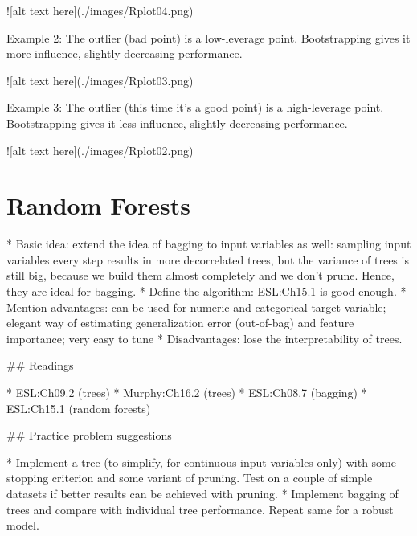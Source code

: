 ![alt text here](./images/Rplot04.png)

Example 2: The outlier (bad point) is a low-leverage point. Bootstrapping gives it more influence, slightly decreasing performance.


![alt text here](./images/Rplot03.png)

Example 3: The outlier (this time it's a good point) is a high-leverage point. Bootstrapping gives it less influence, slightly decreasing performance.

![alt text here](./images/Rplot02.png)


\section{Random Forests}

* Basic idea: extend the idea of bagging to input variables as well: sampling input variables every step results in more decorrelated trees, but the variance of trees is still big, because we build them almost completely and we don't prune. Hence, they are ideal for bagging.
* Define the algorithm: ESL:Ch15.1 is good enough.
* Mention advantages: can be used for numeric and categorical target variable; elegant way of estimating generalization error (out-of-bag) and feature importance; very easy to tune
* Disadvantages: lose the interpretability of trees.

## Readings


* ESL:Ch09.2 (trees)
* Murphy:Ch16.2 (trees)
* ESL:Ch08.7 (bagging)
* ESL:Ch15.1 (random forests)


## Practice problem suggestions

* Implement a tree (to simplify, for continuous input variables only) with some stopping criterion and some variant of pruning. Test on a couple of simple datasets if better results can be achieved with pruning.
* Implement bagging of trees and compare with individual tree performance. Repeat same for a robust model.
